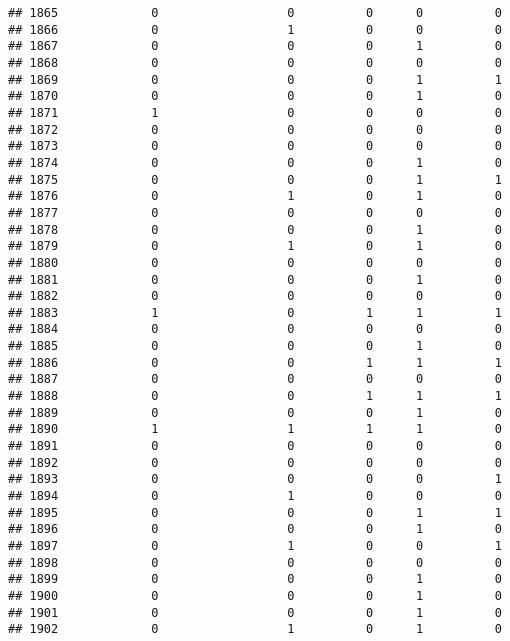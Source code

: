 \documentclass[
]{article}
\begin{document}
\begin{verbatim}
## 1865             0                  0          0      0          0
## 1866             0                  1          0      0          0
## 1867             0                  0          0      1          0
## 1868             0                  0          0      0          0
## 1869             0                  0          0      1          1
## 1870             0                  0          0      1          0
## 1871             1                  0          0      0          0
## 1872             0                  0          0      0          0
## 1873             0                  0          0      0          0
## 1874             0                  0          0      1          0
## 1875             0                  0          0      1          1
## 1876             0                  1          0      1          0
## 1877             0                  0          0      0          0
## 1878             0                  0          0      1          0
## 1879             0                  1          0      1          0
## 1880             0                  0          0      0          0
## 1881             0                  0          0      1          0
## 1882             0                  0          0      0          0
## 1883             1                  0          1      1          1
## 1884             0                  0          0      0          0
## 1885             0                  0          0      1          0
## 1886             0                  0          1      1          1
## 1887             0                  0          0      0          0
## 1888             0                  0          1      1          1
## 1889             0                  0          0      1          0
## 1890             1                  1          1      1          0
## 1891             0                  0          0      0          0
## 1892             0                  0          0      0          0
## 1893             0                  0          0      0          1
## 1894             0                  1          0      0          0
## 1895             0                  0          0      1          1
## 1896             0                  0          0      1          0
## 1897             0                  1          0      0          1
## 1898             0                  0          0      0          0
## 1899             0                  0          0      1          0
## 1900             0                  0          0      1          0
## 1901             0                  0          0      1          0
## 1902             0                  1          0      1          0

\end{verbatim}
\end{document}

